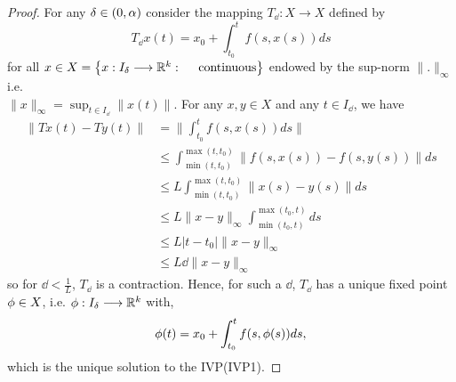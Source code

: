 \begin{proof}
For any $\delta \in   (0, \alpha)  $ consider the mapping 
$ T_{\dd } : X \longrightarrow X$ defined by
\[
T_{\dd }x(t)  = x_0 + \int_{t_0}^{t} f(s, x(s) )  ds
\]
for all $x \in  X = \left\{  x  :  I_{\delta }\longrightarrow \mathbb{R} ^{k}: \quad \text{ continuous}     \right\} $ endowed
by the sup-norm $\| . \| _{\infty } $ i.e.\\  $\| x \| _{\infty } = \sup_{t \in   I_{\dd }} \| x(t)  \| $. For
any $x,y \in   X $ and any $t \in   I_{\dd } $, we have 
\begin{align*}
  \| Tx(t) - Ty(t)   \|  &= \| \int_{t_0}^{t} f(s,x(s) )  ds\|  
  \\
                         & \leq \int_{\min (t, t_0) }^{\max (t, t_0) } 
                         \| f(s, x(s) ) - f(s, y(s) )  \| ds 
                         \\
                         & \leq L \int_{\min (t, t_0) }^{\max (t, t_0) } \| x(s)  - y(s)  \| ds
                         \\
                         & \leq L \| x-y \| _{\infty }\int_{ \min (t_0, t) }^{\max (t_0, t) } ds 
                         \\
                         & \leq L \left| t-t_0 \right|  \| x-y \| _{\infty }
                         \\
                         & \leq  L \dd  \| x-y \| _{\infty }
\end{align*}
so for $\dd  <  \frac{1}{L} $, $T_{\dd } $ is a contraction. Hence, for such a $\dd  $, 
$T_{\dd } $ has a unique fixed point $\phi \in  X $, i.e.  $ \phi  : I_{\delta } \longrightarrow \mathbb{R} ^{k} $ 
with,
\[
\phi (t) = x_0 + \int_{t_0}^{t} f(s, \phi (s) ) ds,
\]
which is the unique solution to the IVP(IVP1).
\end{proof}
